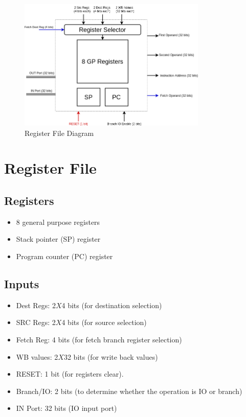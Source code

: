 \documentclass[12pt]{report}
\begin{document}
\begin{center}
    \begin{figure}[hp]
        \centering
        \includegraphics[width=0.8\textwidth]{reg_file}
        \caption{Register File Diagram}
        \label{fig:reg_file}
    \end{figure}
\end{center}

\section{Register File}

\subsection{Registers}
\begin{itemize}
    \item 8 general purpose registers
    \item Stack pointer (SP) register
    \item Program counter (PC) register
\end{itemize}

\subsection{Inputs}
\begin{itemize}
    \item Dest Regs: 2$X$4 bits (for destination selection)
    \item SRC Regs: 2$X$4 bits (for source selection)
    \item Fetch Reg: 4 bits (for fetch branch register selection)
    \item WB values: 2$X$32 bits (for write back values)
    \item RESET: 1 bit (for registers clear).
    \item Branch/IO: 2 bits (to determine whether the operation is IO or branch)
    \item IN Port: 32 bits (IO input port)
\end{itemize}
\end{document}
